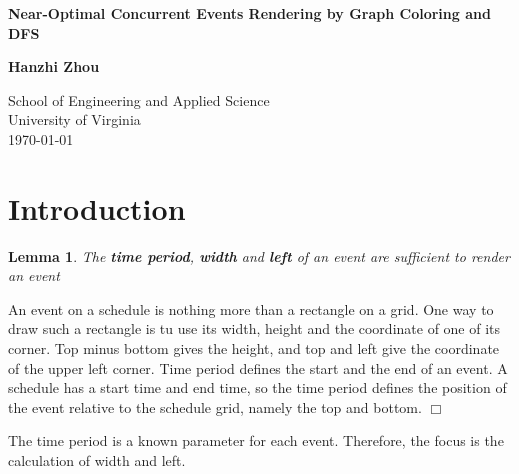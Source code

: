 \documentclass[12pt]{article}
\newtheorem{lemma}{Lemma}
\newenvironment{proof}{\par\noindent{\it Proof.}\hspace*{1em}}{$\Box$\bigskip}
\begin{document}
\begin{titlepage}
    \begin{center}
        \vspace*{1cm}
 
        \LARGE\textbf{Near-Optimal Concurrent Events Rendering by Graph Coloring and DFS}
   
        \vspace{1.5cm}
 
        \textbf{Hanzhi Zhou}
 
        \vfill
        \vspace{0.8cm}

        \Large
        School of Engineering and Applied Science\\
        \vspace{0.2cm}
        University of Virginia\\
        \vspace{0.2cm}
        \today
        \vspace{1cm}
    \end{center}
    \clearpage
\end{titlepage}

\section{Introduction}

\begin{lemma}
    The \textbf{time period}, \textbf{width} and \textbf{left} of an event are sufficient to render an event
\end{lemma}
\begin{proof}
    An event on a schedule is nothing more than a rectangle on a grid. One way to draw such a rectangle is tu use its width, height and the coordinate of one of its corner. Top minus bottom gives the height, and top and left give the coordinate of the upper left corner. Time period defines the start and the end of an event. A schedule has a start time and end time, so the time period defines the position of the event relative to the schedule grid, namely the top and bottom. 
\end{proof}

The time period is a known parameter for each event. Therefore, the focus is the calculation of width and left.
\end{document}
